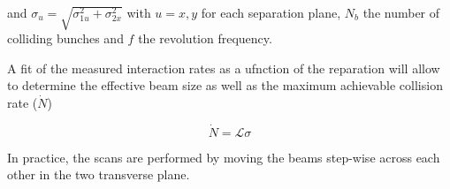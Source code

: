 and $\sigma_{u} = \sqrt{\sigma_{1u}^{2}+\sigma_{2x}^{2}}$ with $u=x,y$ for each separation plane, $N_{b}$ the number of colliding bunches and $f$ the revolution frequency.

A fit of the measured interaction rates as a ufnction of the reparation will allow to determine the effective beam size as well as the maximum achievable collision rate ($\dot{N}$)

\begin{equation}
\dot{N} = \mathcal{L}\sigma
\end{equation}

In practice, the scans are performed by moving the beams step-wise across each other in the two transverse plane.





